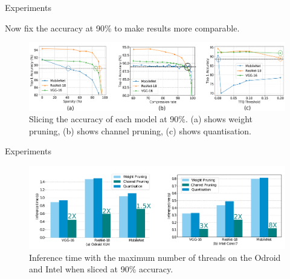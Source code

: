 \documentclass[xcolor=dvipsnames]{beamer}
\begin{document}
\begin{frame}{Experiments}
    
    Now fix the accuracy at 90\% to make results more comparable.
    
    \begin{figure}
        \centering
        \includegraphics[width=\linewidth]{images/accuracy.pdf}
        \caption{Slicing the accuracy of each model at 90\%. (a) shows weight pruning, (b) shows channel pruning, (c) shows quantisation.}
    \end{figure}
    
\end{frame}




\begin{frame}{Experiments}
    \begin{figure}
        \centering
        \includegraphics[width=\linewidth]{images/inf-mem2.pdf}
        \caption{Inference time with the maximum number of threads on the Odroid and Intel when sliced at 90\% accuracy.}
        \label{fig:inf-mem}
    \end{figure}
\end{frame}
\end{document}
